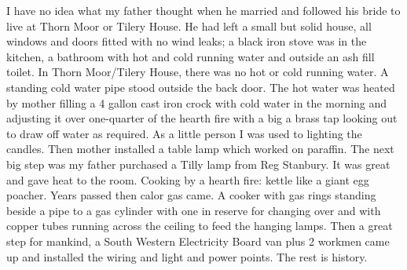 I have no idea what my father thought when he married
and followed his bride to live at Thorn Moor or Tilery House. He had left a
small but solid house, all windows and doors fitted with no wind leaks; a
black iron stove was in the kitchen, a bathroom with hot and cold running
water and outside an ash fill toilet. In Thorn Moor/Tilery House, there was no
hot or cold running water. A standing cold water pipe stood outside the back
door. The hot water was heated by mother filling a 4 gallon cast iron crock
with cold water in the morning and adjusting it over one-quarter of the hearth
fire with a big a brass tap looking out to draw off water as required. As a
little person I was used to lighting the candles. Then mother installed a
table lamp which worked on paraffin. The next big step was my father purchased
a Tilly lamp from Reg Stanbury. It was great and gave heat to the room.
Cooking by a hearth fire: kettle like a giant egg poacher. Years passed then
calor gas came. A cooker with gas rings standing beside a pipe to a gas
cylinder with one in reserve for changing over and with copper tubes running
across the ceiling to feed the hanging lamps. Then a great step for mankind, a
South Western Electricity Board van plus 2 workmen came up and installed the
wiring and light and power points. The rest is history.
